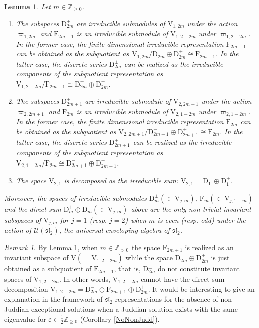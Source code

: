 \documentclass[11pt]{article}
\numberwithin{equation}{section}
\newcommand{\Z}{\mathbb{Z}} %
\newcommand{\e}{\varepsilon}
\newcommand{\RpnSymbol}[1]{\bm{\mathrm{#1}}}
\newcommand{\rF}{\RpnSymbol{F}}
\newcommand{\rV}{\RpnSymbol{V}}
\newcommand{\rD}{\RpnSymbol{D}}
\newcommand{\QEDhere}{\pushQED{\qed}\qedhere\popQED}
\theoremstyle{plain}
\newtheorem{lem}[thm]{Lemma}
\theoremstyle{definition}
\theoremstyle{remark}
\newtheorem{rem}{Remark}[section]
\begin{document}
\begin{lem} \label{lem:reducible}
Let $m\in \Z_{\geq 0}$.
\begin{enumerate}[$(1)$]
\item The subspaces $\rD^{\pm}_{2m}$ are irreducible submodules of $\rV_{1,2m}$ under the action
  $\varpi_{1, 2m}$ and $\rF_{2m-1}$ is an irreducible submodule of $\rV_{1,2-2m}$ under
  $\varpi_{1, 2-2m}$. In the former case, the finite dimensional irreducible representation $\rF_{2m-1}$
  can be obtained as the subquotient as $\rV_{1,2m}/\rD^{-}_{2m}\oplus \rD^{+}_{2m}\cong   \rF_{2m-1} $.
  In the latter case, the discrete series $\rD^{\pm}_{2m}$ can be realized as the irreducible components
  of the subquotient representation as $\rV_{1,2-2m}/\rF_{2m-1} \cong   \rD^{-}_{2m}\oplus \rD^{+}_{2m}$.
\item  The subspaces $\rD^{\pm}_{2m+1}$ are irreducible submodule of $\rV_{2,2m+1}$ under the action
  $\varpi_{2, 2m+1}$ and $\rF_{2m}$ is an irreducible submodule of $\rV_{2,1-2m}$ under $\varpi_{2, 1-2m}$.
  In the former case, the finite dimensional irreducible representation $\rF_{2m}$ can be obtained as the
  subquotient as $\rV_{2,2m+1}/\rD^{-}_{2m+1}\oplus \rD^{+}_{2m+1}\cong   \rF_{2m}$. In the latter case, the discrete
  series $\rD^{\pm}_{2m+1}$ can be realized as  the irreducible components of the subquotient representation
  as $\rV_{2,1-2m}/\rF_{2m} \cong   \rD^{-}_{2m+1}\oplus \rD^{+}_{2m+1}$.
\item The space $\rV_{2,1}$ is decomposed as the irreducible sum:
  $\rV_{2,1}=\rD^{-}_{1}\oplus \rD^{+}_{1}$.
\end{enumerate}
Moreover, the spaces of irreducible submodules
$\rD^{\pm}_{m} (\subset \rV_{j,m})$, $\rF_{m} (\subset \rV_{j,1-m})$ and
the direct sum $\rD^{+}_{m}\oplus \rD^{-}_{m} (\subset\rV_{j,m})$ above are the only
non-trivial invariant subspaces of $\rV_{j,m}$ for $j=1$ (resp. $j=2$) when $m$ is even (resp. odd) under
the action of $\mathcal{U}(\mathfrak{sl}_2)$, the universal enveloping algebra of $\mathfrak{sl}_2$. \QEDhere
\end{lem}

\begin{rem}
  By Lemma \ref{lem:reducible}, when \(m \in \Z_{> 0}\) the space \( \rF_{2m+1} \) is realized as an invariant subspace of \( \rV (= \rV_{1,2-2m})\)
  while the space \(\rD^-_{2 m}\oplus \rD^+_{2 m}\) is just obtained as a subquotient of \( \rF_{2m+1} \), that is, \(\rD^\pm_{2 m}\) do not constitute
  invariant spaces of $\rV_{1,2-2m}$. In other words, \(\rV_{1,2-2 m} \) cannot have the direct sum decomposition
  \(\rV_{1,2-2 m} = \rD^-_{2 m} \oplus \rF_{2m+1}  \oplus \rD^+_{2 m}\). It would be interesting to give an explanation in the framework of \(\mathfrak{sl}_2 \)
  representations for the absence of non-Juddian exceptional solutions when a Juddian solution exists with the same eigenvalue
  for $\e\in \frac12 \Z_{\geq0}$ (Corollary \ref{NoNonJudd}).
\end{rem}
  
\end{document}
